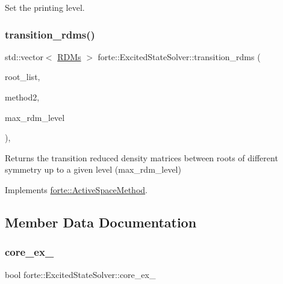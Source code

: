 Set the printing level. 

\mbox{\label{classforte_1_1_excited_state_solver_a8fa122b902c65b75470e34cdd475acaf}} 
\subsubsection{\texorpdfstring{transition\+\_\+rdms()}{transition\_rdms()}}
{\footnotesize\ttfamily std\+::vector$<$ \mbox{\hyperlink{classforte_1_1_r_d_ms}{R\+D\+Ms}} $>$ forte\+::\+Excited\+State\+Solver\+::transition\+\_\+rdms (\begin{DoxyParamCaption}\item[{const std\+::vector$<$ std\+::pair$<$ size\+\_\+t, size\+\_\+t $>$$>$ \&}]{root\+\_\+list,  }\item[{std\+::shared\+\_\+ptr$<$ \mbox{\hyperlink{classforte_1_1_active_space_method}{Active\+Space\+Method}} $>$}]{method2,  }\item[{int}]{max\+\_\+rdm\+\_\+level }\end{DoxyParamCaption})\hspace{0.3cm}{\ttfamily [override]}, {\ttfamily [virtual]}}

Returns the transition reduced density matrices between roots of different symmetry up to a given level (max\+\_\+rdm\+\_\+level) 

Implements \mbox{\hyperlink{classforte_1_1_active_space_method_a4460069915e56a1994d3a4a4e78bdb30}{forte\+::\+Active\+Space\+Method}}.



\subsection{Member Data Documentation}
\mbox{\label{classforte_1_1_excited_state_solver_acbbb9da97416aeb1810c9cb0a4d6926d}} 
\subsubsection{\texorpdfstring{core\+\_\+ex\+\_\+}{core\_ex\_}}
{\footnotesize\ttfamily bool forte\+::\+Excited\+State\+Solver\+::core\+\_\+ex\+\_\+\hspace{0.3cm}{\ttfamily [protected]}}




